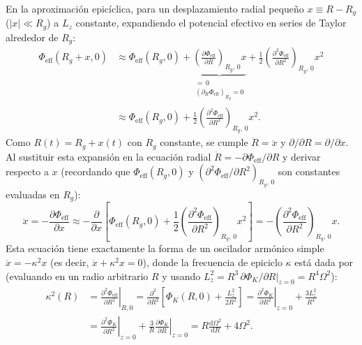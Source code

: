 \documentclass[11pt,letterpaper]{article}
\begin{document}
En la aproximación epicíclica, para un desplazamiento radial pequeño $x \equiv R - R_g$ ($|x| \ll R_g$) a $L_z$ constante, expandiendo el potencial efectivo en series de Taylor alrededor de $R_g$:
\begin{align}
    \Phi_{\mathrm{eff}}(R_g + x, 0)
    &\approx \Phi_{\mathrm{eff}}(R_g, 0)
    + \underbrace{
        \left(
            \frac{\partial \Phi_{\mathrm{eff}}}{\partial R}
        \right)_{R_g,\,0}
        x
    }_{\substack{=\,0 \\[1pt] (\partial_R\Phi_{\mathrm{eff}})_{R_g}=0}}
    + \frac{1}{2}
    \left(
        \frac{\partial^2 \Phi_{\mathrm{eff}}}{\partial R^2}
    \right)_{R_g,\,0}
    x^2 \nonumber \\
    &\approx \Phi_{\mathrm{eff}}(R_g, 0)
    + \frac{1}{2}
    \left(
        \frac{\partial^2 \Phi_{\mathrm{eff}}}{\partial R^2}
    \right)_{R_g,\,0}
    x^2.
    \label{eq:phi_eff_expansion}
\end{align}
Como $R(t) = R_g + x(t)$ con $R_g$ constante, se cumple $\ddot{R} = \ddot{x}$ y $\partial/\partial R = \partial/\partial x$. Al sustituir esta expansión en la ecuación radial $\ddot{R} = -\partial\Phi_{\mathrm{eff}}/\partial R$ y derivar respecto a $x$ (recordando que $\Phi_{\mathrm{eff}}(R_g, 0)$ y $(\partial^2\Phi_{\mathrm{eff}}/\partial R^2)_{R_g,\,0}$ son constantes evaluadas en $R_g$):
\begin{equation}
    \ddot{x} = -\frac{\partial \Phi_{\mathrm{eff}}}{\partial x}
    \approx -\frac{\partial}{\partial x}\!\left[
        \Phi_{\mathrm{eff}}(R_g, 0)
        + \frac{1}{2}\left(\frac{\partial^2 \Phi_{\mathrm{eff}}}{\partial R^2}\right)_{R_g,\,0} x^2
    \right]
    = -\left(\frac{\partial^2 \Phi_{\mathrm{eff}}}{\partial R^2}\right)_{R_g,\,0} x.
\end{equation}
Esta ecuación tiene exactamente la forma de un oscilador armónico simple $\ddot{x} = -\kappa^2 x$ (es decir, $\ddot{x} + \kappa^2 x = 0$), donde la frecuencia de epiciclo $\kappa$ está dada por (evaluando en un radio arbitrario $R$ y usando $L_z^2 = R^3\,\partial\Phi_K/\partial R|_{z=0} = R^4\Omega^2$):
\begin{align}
    \kappa^2(R) &= \left.\frac{\partial^2 \Phi_{\mathrm{eff}}}{\partial R^2}\right|_{R,0}
    = \frac{\partial^2}{\partial R^2}\!\left[\Phi_K(R, 0) + \frac{L_z^2}{2R^2}\right]
    = \left.\frac{\partial^2 \Phi_K}{\partial R^2}\right|_{z=0} + \frac{3 L_z^2}{R^4} \nonumber \\
    &= \left.\frac{\partial^2 \Phi_K}{\partial R^2}\right|_{z=0} + \frac{3}{R}\left.\frac{\partial \Phi_K}{\partial R}\right|_{z=0}
    = R\frac{\mathrm{d}\Omega^2}{\mathrm{d}R} + 4\Omega^2.
    \label{eq:kappa_def}
\end{align}
\end{document}
